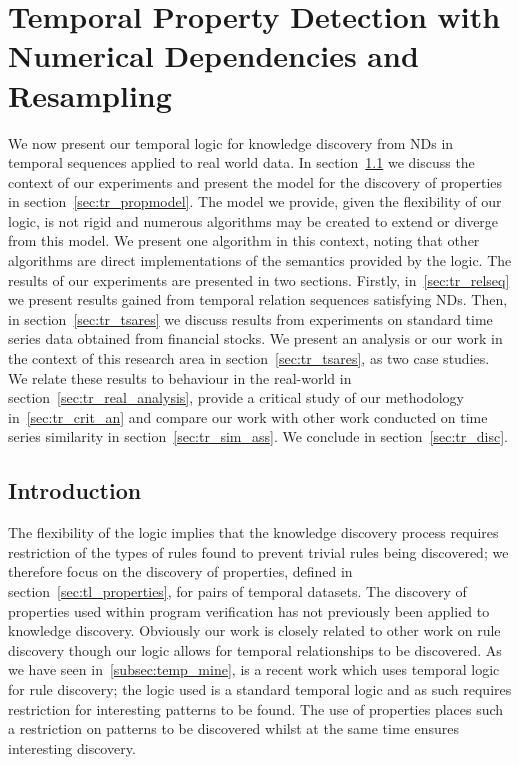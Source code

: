 \chapter{Temporal Property Detection with Numerical Dependencies and
Resampling}\label{chap:tempresult}

We now present our temporal logic for knowledge discovery from NDs in
temporal sequences applied to
real world data. In section~\ref{sec:tr_intro} we discuss  the context
of our experiments and present the model for the discovery of
properties in section~\ref{sec:tr_propmodel}. The model we provide,
given the flexibility of our logic, is not rigid and numerous
algorithms may be created to extend or diverge from this model. 
We present one algorithm in this context, noting that other algorithms
are direct implementations of the semantics provided by the logic. 
The results of our
experiments are presented in two sections. Firstly,
in~\ref{sec:tr_relseq} we present results gained from temporal
relation sequences satisfying NDs. Then, in
section~\ref{sec:tr_tsares} we discuss results from experiments on
standard time series data obtained from financial stocks. We present
an analysis or our work in the context of this research area in
section~\ref{sec:tr_tsares}, as two case studies. We relate these results to behaviour in
the real-world in section~\ref{sec:tr_real_analysis}, provide a
critical study of our methodology in~\ref{sec:tr_crit_an} and compare
our work with other work conducted on time series similarity in
section~\ref{sec:tr_sim_ass}. We conclude in section~\ref{sec:tr_disc}.

\section{Introduction}\label{sec:tr_intro}

The flexibility of the
logic implies that the knowledge discovery process requires
restriction of the types of rules found to prevent trivial rules being
discovered; we therefore focus on the discovery of properties, defined
in section~\ref{sec:tl_properties}, 
for pairs of temporal datasets. The discovery of properties used
within program verification has not previously been applied to
knowledge discovery. Obviously our 
work is closely related to other work on rule discovery though our
logic allows for temporal relationships to be discovered. As we have
seen in~\ref{subsec:temp_mine}, \cite{bt98} is
a recent work which uses temporal logic for rule discovery; the logic
used is a standard temporal logic and as such requires restriction for
interesting patterns to be found. The use of properties places such a
restriction on patterns to be discovered whilst at the same time
ensures interesting discovery.

